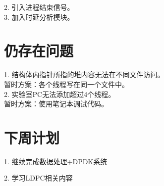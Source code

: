 \documentclass{article}
\begin{document}
2. 引入进程结束信号。\\

3. 加入时延分析模块。\\

\section{仍存在问题}
1. 结构体内指针所指的堆内容无法在不同文件访问。\\
暂时方案：各个线程写在同一个文件中。\\

2. 实验室PC无法添加超过4个线程。\\
暂时方案：使用笔记本调试代码。\\

\section{下周计划}
1. 继续完成数据处理+DPDK系统

2. 学习LDPC相关内容
\end{document}

